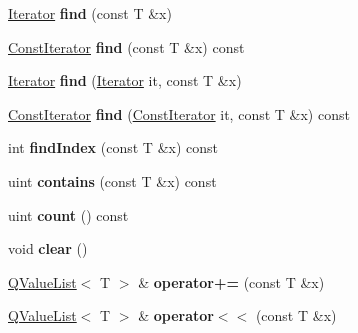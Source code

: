 \begin{DoxyCompactItemize}
\mbox{\hyperlink{class_q_value_list_a043c8661906b45f062d493601804a5ea}{Iterator}} {\bfseries find} (const T \&x)
\item 
\mbox{\label{class_q_value_list_aac4ecff504a85c3280841243c670b654}} 
\mbox{\hyperlink{class_q_value_list_const_iterator}{Const\+Iterator}} {\bfseries find} (const T \&x) const
\item 
\mbox{\label{class_q_value_list_abb6344c15f2d8905f6fcbed89314c6ec}} 
\mbox{\hyperlink{class_q_value_list_a043c8661906b45f062d493601804a5ea}{Iterator}} {\bfseries find} (\mbox{\hyperlink{class_q_value_list_a043c8661906b45f062d493601804a5ea}{Iterator}} it, const T \&x)
\item 
\mbox{\label{class_q_value_list_a68582d5853740b190d3940b282036a13}} 
\mbox{\hyperlink{class_q_value_list_const_iterator}{Const\+Iterator}} {\bfseries find} (\mbox{\hyperlink{class_q_value_list_const_iterator}{Const\+Iterator}} it, const T \&x) const
\item 
\mbox{\label{class_q_value_list_ad0a76ae15cafedeeadd12ba1f4a92b37}} 
int {\bfseries find\+Index} (const T \&x) const
\item 
\mbox{\label{class_q_value_list_a39128ec92d123f5488632eb05a853978}} 
uint {\bfseries contains} (const T \&x) const
\item 
\mbox{\label{class_q_value_list_a13e037c1fc23b4cebdd35cfcd0f9841a}} 
uint {\bfseries count} () const
\item 
\mbox{\label{class_q_value_list_ac026366cf25ad91b6cbacf291a75b420}} 
void {\bfseries clear} ()
\item 
\mbox{\label{class_q_value_list_a454d57e59775a62a6a05cec8ce019369}} 
\mbox{\hyperlink{class_q_value_list}{Q\+Value\+List}}$<$ T $>$ \& {\bfseries operator+=} (const T \&x)
\item 
\mbox{\label{class_q_value_list_a2a037d16e790d81a5b1caea4d485ca09}} 
\mbox{\hyperlink{class_q_value_list}{Q\+Value\+List}}$<$ T $>$ \& {\bfseries operator$<$$<$} (const T \&x)
\end{DoxyCompactItemize}

